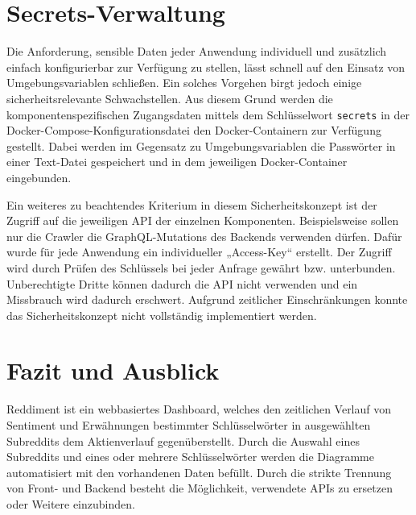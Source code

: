 \documentclass[a4paper, 10pt, conference]{IEEEtran}
\begin{document}
\section{Secrets-Verwaltung} \label{s:secrets}

Die Anforderung, sensible Daten jeder Anwendung individuell und zusätzlich einfach konfigurierbar zur Verfügung zu stellen, lässt schnell auf den Einsatz von Umgebungsvariablen schließen. Ein solches Vorgehen birgt jedoch einige sicherheitsrelevante Schwachstellen. Aus diesem Grund werden die komponentenspezifischen Zugangsdaten mittels dem Schlüsselwort \texttt{secrets} in der Docker-Compose-Konfigurationsdatei den Docker-Containern zur Verfügung gestellt. Dabei werden im Gegensatz zu Umgebungsvariablen die Passwörter in einer Text-Datei gespeichert und in dem jeweiligen Docker-Container eingebunden.

Ein weiteres zu beachtendes Kriterium in diesem Sicherheitskonzept ist der Zugriff auf die jeweiligen API der einzelnen Komponenten. Beispielsweise sollen nur die Crawler die GraphQL-Mutations des Backends verwenden dürfen. Dafür wurde für jede Anwendung ein individueller „Access-Key“ erstellt. Der Zugriff wird durch Prüfen des Schlüssels bei jeder Anfrage gewährt bzw. unterbunden. Unberechtigte Dritte können dadurch die API nicht verwenden und ein Missbrauch wird dadurch erschwert. Aufgrund zeitlicher Einschränkungen konnte das Sicherheitskonzept nicht vollständig implementiert werden.

\section{Fazit und Ausblick} \label{s:fazit}

Reddiment ist ein webbasiertes Dashboard, welches den zeitlichen Verlauf von Sentiment und Erwähnungen bestimmter Schlüsselwörter in ausgewählten Subreddits dem Aktienverlauf gegenüberstellt. Durch die Auswahl eines Subreddits und eines oder mehrere Schlüsselwörter werden die Diagramme automatisiert mit den vorhandenen Daten befüllt.
Durch die strikte Trennung von Front- und Backend besteht die Möglichkeit, verwendete APIs zu ersetzen oder Weitere einzubinden.

\printbibliography
\end{document}
